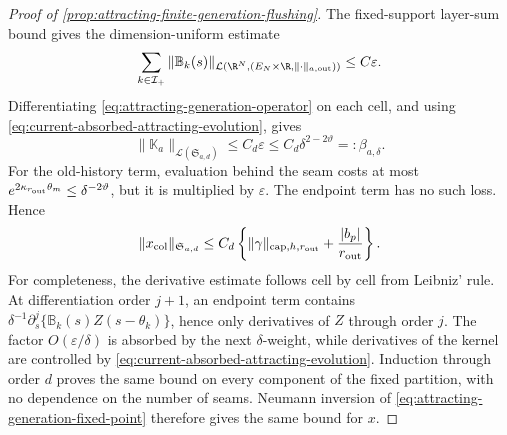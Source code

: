 \begin{proof}[Proof of
\cref{prop:attracting-finite-generation-flushing}]
The fixed-support layer-sum bound gives the dimension-uniform estimate
\begin{equation*}
 \sum_{k\in\mathcal I_+}
 \|\mathbb B_k(s)\|_{\mathcal L(\R^N,
          (E_N\times\R,\|\cdot\|_{a,\rm out}))}
 \le C\varepsilon.
\end{equation*}
Differentiating
\cref{eq:attracting-generation-operator} on each cell, and using
\cref{eq:current-absorbed-attracting-evolution}, gives
\begin{equation}
 \|\mathbb K_a\|_{\mathcal L(\mathfrak S_{a,d})}
 \le C_d\varepsilon
 \le C_d\delta^{2-2\vartheta}=:\beta_{a,\delta}.   \label{eq:attracting-generation-number}
\end{equation}
For the old-history term, evaluation behind the seam costs at most
\(e^{2\kappa_{r_{\rm out}}\theta_m}\le\delta^{-2\vartheta}\), but it is
multiplied by \(\varepsilon\).  The endpoint term has no such loss.  Hence
\begin{equation}
 \|x_{\rm col}\|_{\mathfrak S_{a,d}}
 \le C_d\left\{\|\gamma\|_{\mathrm{cap},h,r_{\rm out}}
                 +\frac{|b_p|}{r_{\rm out}}\right\}.           \label{eq:attracting-direct-collar-bound}
\end{equation}
For completeness, the derivative estimate follows cell by cell from
Leibniz' rule.  At differentiation order \(j+1\), an endpoint term contains
\(\delta^{-1}\partial_s^j\{\mathbb B_k(s)Z(s-\theta_k)\}\), hence only
derivatives of \(Z\) through order \(j\).  The factor
\(O(\varepsilon/\delta)\) is absorbed by the next \(\delta\)-weight, while
derivatives of the kernel are controlled by
\cref{eq:current-absorbed-attracting-evolution}.  Induction through order
\(d\) proves the same bound on every component of the fixed partition, with
no dependence on the number of seams.  Neumann inversion of
\cref{eq:attracting-generation-fixed-point} therefore gives the same bound
for \(x\).


\end{proof}
